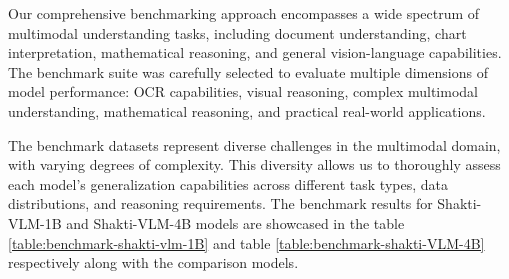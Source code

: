 \documentclass{article}
\begin{document}
Our comprehensive benchmarking approach encompasses a wide spectrum of multimodal understanding tasks, including document understanding, chart interpretation, mathematical reasoning, and general vision-language capabilities. The benchmark suite was carefully selected to evaluate multiple dimensions of model performance: OCR capabilities, visual reasoning, complex multimodal understanding, mathematical reasoning, and practical real-world applications. 

The benchmark datasets represent diverse challenges in the multimodal domain, with varying degrees of complexity. This diversity allows us to thoroughly assess each model's generalization capabilities across different task types, data distributions, and reasoning requirements. The benchmark results for Shakti-VLM-1B and Shakti-VLM-4B models are showcased in the table \ref{table:benchmark-shakti-vlm-1B} and table \ref{table:benchmark-shakti-VLM-4B} respectively along with the comparison models. 
\end{document}
